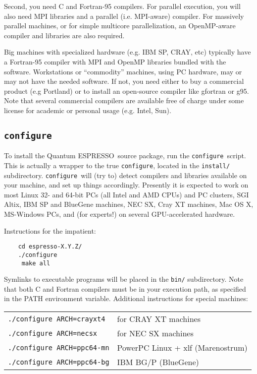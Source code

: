 \documentclass[12pt,a4paper]{article}
\def\qe{{\sc Quantum ESPRESSO}}
\def\configure{\texttt{configure}}
\begin{document}
Second, you need C and Fortran-95 compilers. For parallel 
execution, you will also need MPI libraries and a parallel
(i.e. MPI-aware) compiler. For massively parallel machines, or 
for simple multicore parallelization, an OpenMP-aware compiler
and libraries are also required.

Big machines with
specialized hardware (e.g. IBM SP, CRAY, etc) typically have a
Fortran-95 compiler with MPI and OpenMP libraries bundled with 
the software. Workstations or ``commodity'' machines, using PC 
hardware, may or may not have the needed software. If not, you need 
either to buy a commercial product (e.g Portland) or to install
an open-source compiler like gfortran or g95. 
Note that several commercial compilers are available free of charge
under some license for academic or personal usage (e.g. Intel, Sun). 

\subsection{\configure}

To install the \qe\ source package, run the \configure{}ript. This is actually a wrapper to the true \configure,
located in the \texttt{install/} subdirectory. \configure\
will (try to) detect compilers and libraries available on
your machine, and set up things accordingly. Presently it is expected
to work on most Linux 32- and 64-bit PCs (all Intel and AMD CPUs) and 
PC clusters, SGI Altix, IBM SP and BlueGene machines, NEC SX, Cray XT
machines, Mac OS X, MS-Windows PCs, and (for experts!) on several 
GPU-accelerated hardware. 

Instructions for the impatient:
\begin{verbatim}
    cd espresso-X.Y.Z/
    ./configure
     make all
\end{verbatim}
Symlinks to executable programs will be placed in the
\texttt{bin/}
subdirectory. Note that both C and Fortran compilers must be in your execution
path, as specified in the PATH environment variable.
Additional instructions for special machines:

\begin{tabular}{ll}
    \texttt{./configure ARCH=crayxt4}& for CRAY XT machines \\
    \texttt{./configure ARCH=necsx}   & for NEC SX machines \\
    \texttt{./configure ARCH=ppc64-mn}& PowerPC Linux + xlf (Marenostrum) \\
    \texttt{./configure ARCH=ppc64-bg}& IBM BG/P (BlueGene)
\end{tabular}
\end{document}
